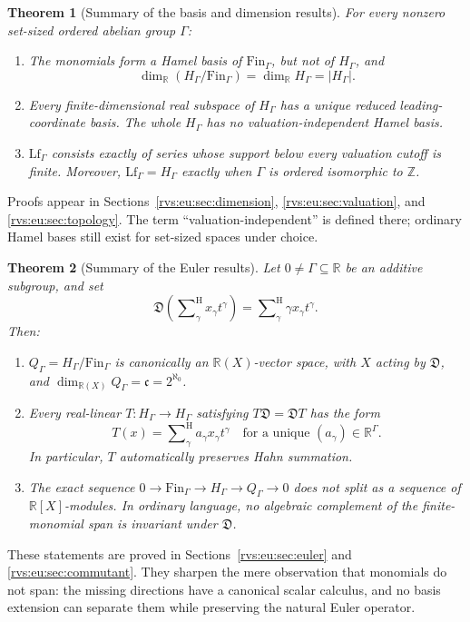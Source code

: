 \documentclass[11pt,letterpaper]{article}
\numberwithin{equation}{section}
\newtheorem{theorem}{Theorem}[section]
\theoremstyle{definition}
\theoremstyle{remark}
\newcommand{\R}{\mathbb{R}}
\newcommand{\Z}{\mathbb{Z}}
\newcommand{\ct}{\operatorname{ct}}
\newcommand{\hSum}{\mathop{\sum}\nolimits^{\mathrm H}}
\newcommand{\cont}{\mathfrak c}%
\newcommand{\EuD}{\mathfrak D}%
\newcommand{\FinS}[1]{\mathrm{Fin}_{#1}}%
\newcommand{\LfS}[1]{\mathrm{Lf}_{#1}}%
\begin{document}
\begin{theorem}[Summary of the basis and dimension results]\label{rvs:eu:thm:summarybasis}
For every nonzero set-sized ordered abelian group $\Gamma$:
\begin{enumerate}
\item The monomials form a Hamel basis of $\FinS{\Gamma}$, but not of $H_\Gamma$, and
\[
 \dim_\R(H_\Gamma/\FinS{\Gamma})=\dim_\R H_\Gamma=|H_\Gamma|.
\]
\item Every finite-dimensional real subspace of $H_\Gamma$ has a unique reduced leading-coordinate basis. The whole $H_\Gamma$ has no valuation-independent Hamel basis.
\item $\LfS{\Gamma}$ consists exactly of series whose support below every valuation cutoff is finite. Moreover, $\LfS{\Gamma}=H_\Gamma$ exactly when $\Gamma$ is ordered isomorphic to $\Z$.
\end{enumerate}
\end{theorem}
Proofs appear in Sections~\ref{rvs:eu:sec:dimension}, \ref{rvs:eu:sec:valuation}, and \ref{rvs:eu:sec:topology}. The term ``valuation-independent'' is defined there; ordinary Hamel bases still exist for set-sized spaces under choice.

\begin{theorem}[Summary of the Euler results]\label{rvs:eu:thm:summaryeuler}
Let $0\ne\Gamma\subseteq\R$ be an additive subgroup, and set
\[
 \EuD\left(\hSum_\gamma x_\gamma t^\gamma\right)
 =\hSum_\gamma \gamma x_\gamma t^\gamma.
\]
Then:
\begin{enumerate}
\item $Q_\Gamma=H_\Gamma/\FinS{\Gamma}$ is canonically an $\R(X)$-vector space, with $X$ acting by $\EuD$, and $\dim_{\R(X)}Q_\Gamma=\cont=2^{\aleph_0}$.
\item Every real-linear $T:H_\Gamma\to H_\Gamma$ satisfying $T\EuD=\EuD T$ has the form %
\[
 T(x)=\hSum_\gamma a_\gamma x_\gamma t^\gamma
 \quad\text{for a unique }(a_\gamma)\in\R^\Gamma.
\]
In particular, $T$ automatically preserves Hahn summation.
\item The exact sequence $0\to \FinS{\Gamma}\to H_\Gamma\to Q_\Gamma\to0$ does not split as a sequence of $\R[X]$-modules. In ordinary language, no algebraic complement of the finite-monomial span is invariant under $\EuD$.
\end{enumerate}
\end{theorem}
These statements are proved in Sections~\ref{rvs:eu:sec:euler} and \ref{rvs:eu:sec:commutant}. They sharpen the mere observation that monomials do not span: the missing directions have a canonical scalar calculus, and no basis extension can separate them while preserving the natural Euler operator.
\end{document}
